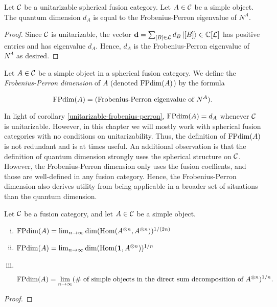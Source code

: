 \begin{cor}\label{unitarizable-frobenius-perron} Let ${\mathcal C}$ be a unitarizable spherical fusion category. Let $A\in {\mathcal C}$ be a simple object. The quantum dimension $d_A$ is equal to the Frobenius-Perron eigenvalue of $N^A$.
\end{cor}
\begin{proof} Since ${\mathcal C}$  is unitarizable, the vector $\bold{d} = \sum_{[B]\in {\mathcal L}} d_{B}\ket{[B]}\in {\mathbb C}[{\mathcal L}]$ has positive entries and has eigenvalue $d_A$. Hence, $d_A$ is the Frobenius-Perron eigenvalue of $N^A$ as desired.
\end{proof}

\begin{defn} Let $A\in{\mathcal C}$ be a simple object in a spherical fusion category. We define the {\em Frobenius-Perron dimension} of $A$ (denoted $\operatorname{FPdim}(A)$) by the formula

$$\operatorname{FPdim}(A)=(\text{Frobenius-Perron eigenvalue of $N^A$}).$$
\end{defn}

\begin{rem} In light of corollary \ref{unitarizable-frobenius-perron}, $\operatorname{FPdim}(A)=d_A$ whenever ${\mathcal C}$ is unitarizable. However, in this chapter we will mostly work with spherical fusion categories with no conditions on unitarizability. Thus, the definition of $\operatorname{FPdim}(A)$ is not redundant and is at times useful. An additional observation is that the definition of quantum dimension strongly uses the spherical structure on ${\mathcal C}$. However, the Frobenius-Perron dimension only uses the fusion coeffients, and those are well-defined in any fusion category. Hence, the Frobenius-Perron dimension also derives utility from being applicable in a broader set of situations than the quantum dimension.
\end{rem}

\begin{prop}\label{tensor-power-growth} Let ${\mathcal C}$ be a fusion category, and let $A\in {\mathcal C}$ be a simple object.

\begin{enumerate}[(i)]
\item $\operatorname{FPdim}(A)=\lim_{n\to\infty}\dim(\operatorname{Hom}(A^{\otimes n},A^{\otimes n}))^{1/(2n)}$
\item $\operatorname{FPdim}(A)=\lim_{n\to\infty}\dim(\operatorname{Hom}({\mathbf 1},A^{\otimes n}))^{1/n}$
\item $\,$

$$\operatorname{FPdim}(A)=\lim_{n\to\infty}(\text{\# of simple objects in the direct sum decomposition of $A^{\otimes n}$})^{1/n}.$$
\end{enumerate}
\end{prop}
\begin{proof}
\end{proof}

